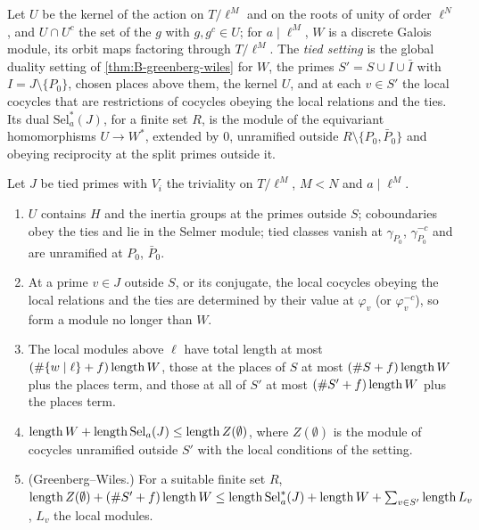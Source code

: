 Let $U$ be the kernel of the action on $T/\ell^M$ and on the roots of unity of order $\ell^N$, and $U\cap U^c$ the set of the $g$ with $g,g^c\in U$; for $a\mid\ell^M$, $W$ is a discrete Galois module, its orbit maps factoring through $T/\ell^M$. The \emph{tied setting} is the global duality setting of \cref{thm:B-greenberg-wiles} for
$W$, the primes $S'=S\cup I\cup\bar I$ with $I=J\setminus\{P_0\}$, chosen places above them, the kernel $U$, and at each $v\in S'$ the local cocycles that are restrictions of cocycles obeying the local relations and the ties. Its dual $\mathrm{Sel}^*_a(J)$, for a finite set $R$, is the module of the equivariant homomorphisms $U\to W^*$,
extended by $0$, unramified outside $R\setminus\{P_0,\bar P_0\}$ and obeying reciprocity at the split primes outside it.

\begin{lemma}\label{lem:tied-setting}
Let $J$ be tied primes with $V_i$ the triviality on $T/\ell^M$, $M<N$ and $a\mid\ell^M$.
\begin{enumerate}[label=\textup{(\alph*)}]
\item $U$ contains $H$ and the inertia groups at the primes outside $S$; coboundaries obey the ties and lie in the Selmer module; tied classes vanish at $\gamma_{P_0}$, $\gamma_{P_0}^{-c}$ and are unramified at $P_0$, $\bar P_0$.
\item At a prime $v\in J$ outside $S$, or its conjugate, the local cocycles obeying the local relations and the ties are determined by their value at $\varphi_v$ (or $\varphi_v^{-c}$), so form a module no longer than $W$.
\item The local modules above $\ell$ have total length at most $(\#\{w\mid\ell\}+f)\operatorname{length} W$, those at the places of $S$ at most $(\#S+f)\operatorname{length} W$ plus the places term, and those at all of $S'$ at most $(\#S'+f)\operatorname{length} W$ plus the places term.
\item $\operatorname{length} W+\operatorname{length}\mathrm{Sel}_a(J)\le\operatorname{length} Z(\emptyset)$, where $Z(\emptyset)$ is the module of cocycles unramified outside $S'$ with the local conditions of the setting.
\item (Greenberg--Wiles.) For a suitable finite set $R$, $\operatorname{length} Z(\emptyset)+(\#S'+f)\operatorname{length} W\le\operatorname{length}\mathrm{Sel}^*_a(J)+\operatorname{length} W+\sum_{v\in S'}\operatorname{length} L_v$, $L_v$ the local modules.
\end{enumerate}
\end{lemma}


